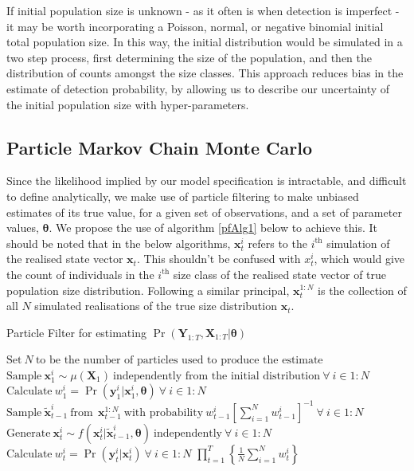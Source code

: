 \documentclass[a4paper,12pt]{article}
\begin{document}
If initial population size is unknown - as it often is when detection is imperfect - it may be worth incorporating a Poisson, normal, or negative binomial initial total population size. In this way, the initial distribution would be simulated in a two step process, first determining the size of the population, and then the distribution of counts amongst the size classes. This approach reduces bias in the estimate of detection probability, by allowing us to describe our uncertainty of the initial population size with hyper-parameters. 

\subsection{Particle Markov Chain Monte Carlo}
Since the likelihood implied by our model specification is intractable, and difficult to define analytically, we make use of particle filtering to make unbiased estimates of its true value, for a given set of observations, and a set of parameter values, $\boldsymbol{\theta}$. We propose the use of algorithm \ref{pfAlg1} below to achieve this. It should be noted that in the below algorithms, $\boldsymbol{x}^{i}_{t}$ refers to the $i^{\text{th}}$ simulation of the realised state vector $\boldsymbol{x}_t$. This shouldn't be confused with $x^i_t$, which would give the count of individuals in the $i^{\text{th}}$ size class of the realised state vector of true population size distribution. Following a similar principal, $\boldsymbol{x}_t^{1:N}$ is the collection of all $N$ simulated realisations of the true size distribution $\boldsymbol{x}_t$.

\begin{algorithm}
\caption{\label{pfAlg1} Particle Filter for estimating $\Pr(\boldsymbol{Y}_{1:T}, \boldsymbol{X}_{1:T}| \boldsymbol{\theta})$}
\begin{algorithmic}[1]
\begin{spacing}{1.8}
\STATE $\text{Set} \ N \  \text{to be the number of particles used to produce the estimate}$
\STATE $\text{Sample} \ \boldsymbol{x}_1^{i} \sim \mu(\boldsymbol{X}_1) \ \text{independently from the initial distribution} \  \forall \ i \in 1:N $
\STATE $\text{Calculate} \ w^i_1 = \Pr(\boldsymbol{y}^i_1 | \boldsymbol{x}_1^i, \boldsymbol{\theta})\  \forall \ i \in 1:N$
       \STATE $\text{Sample} \ \boldsymbol{\tilde{x}}_{t-1}^{i} \ \text{from}\ \ \boldsymbol{x}_{t-1}^{1:N} \ \text{with probability} \  w_{t-1}^{i}{\left[\sum_{i=1}^N{w_{t-1}^i}\right]}^{-1} \  \forall \ i \in 1:N$
       \STATE $\text{Generate} \ \boldsymbol{x}_t^{i} \sim f(\boldsymbol{x}_t^{i} | \boldsymbol{\tilde{x}}_{t-1}^{i}, \boldsymbol{\theta}) \ \text{independently} \  \forall \ i \in 1:N $
       \STATE $\text{Calculate} \ w^i_t = \Pr(\boldsymbol{y}^i_t | \boldsymbol{x}_t^i)\  \forall \ i \in 1:N$
\ENDFOR
\RETURN $\prod_{t=1}^T \left\{ \frac{1}{N} \sum_{i=1}^N w_t^i\right\}$
\end{spacing}
\end{algorithmic}
\end{algorithm}
\end{document}
